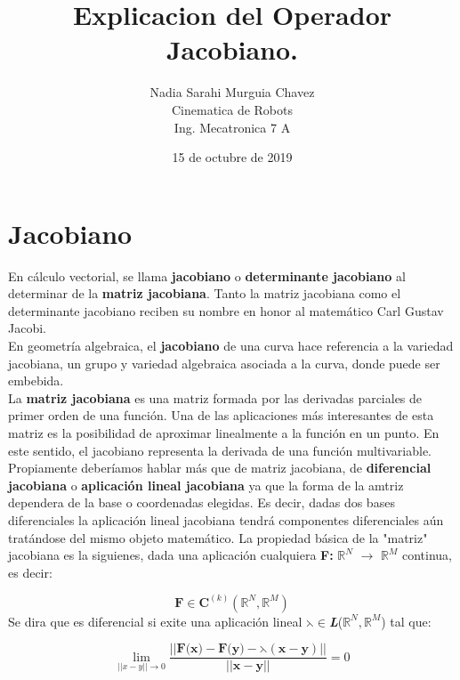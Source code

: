 \documentclass[letter,openrigh,12pt,spanish]{report}
\title{\textbf{Explicacion del Operador Jacobiano.}}
\author{Nadia Sarahi Murguia Chavez\\
		Cinematica de Robots\\
		Ing. Mecatronica 7 A}
\date{15 de octubre de 2019}
\begin{document}
\maketitle

\section{Jacobiano}
En c\'alculo vectorial, se llama \textbf{jacobiano} o \textbf{determinante jacobiano} al determinar de la \textbf{matriz jacobiana}. Tanto la matriz jacobiana como el determinante jacobiano reciben su nombre en honor al matem\'atico Carl Gustav Jacobi.\\
En geometr\'ia algebraica, el \textbf{jacobiano} de una curva hace referencia a la variedad jacobiana, un grupo y variedad algebraica asociada a la curva, donde puede ser embebida.\\
La \textbf{matriz jacobiana} es una matriz formada por las derivadas parciales de primer orden de una funci\'on. Una de las aplicaciones m\'as interesantes de esta matriz es la posibilidad de aproximar linealmente a la funci\'on en un punto. En este sentido, el jacobiano representa la derivada de una funci\'on multivariable.\\
Propiamente deber\'iamos hablar m\'as que de matriz jacobiana, de \textbf{diferencial jacobiana} o \textbf{aplicaci\'on lineal jacobiana} ya que la forma de la amtriz dependera de la base o coordenadas elegidas. Es decir, dadas dos bases diferenciales la aplicaci\'on lineal jacobiana tendr\'a componentes diferenciales a\'un trat\'andose del mismo objeto matem\'atico. La propiedad b\'asica de la "matriz" jacobiana es la siguienes, dada una aplicaci\'on cualquiera \textbf{F:} $\mathbb{R}^N$ $\longrightarrow$ $\mathbb{R}^M$ continua, es decir:

\begin{displaymath}
\textbf{F}\in\textbf{C}^{(k)}(\mathbb{R}^N,\mathbb{R}^M)
\end{displaymath}
Se dira que es diferencial si exite una aplicaci\'on lineal \textbf{$\leftthreetimes$}$\in$\textbf{\textit{L}}($\mathbb{R}^N,\mathbb{R}^M$) tal que:

\begin{center}
\begin{displaymath}
\lim\limits_{||x-y|| \rightarrow 0} \frac{||\textbf{F(x)}-\textbf{F(y)}-\leftthreetimes(\textbf{x}-\textbf{y})||}{||\textbf{x}-\textbf{y}||}=0
\end{displaymath}
\end{center}
\end{document}
